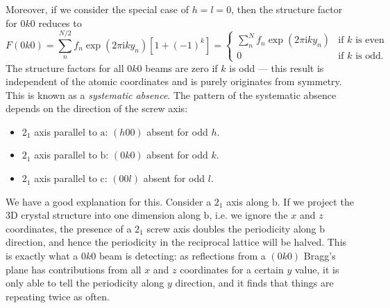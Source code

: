\documentclass{article}
\theoremstyle{plain}\theoremheaderfont{\normalfont\itshape}\theorembodyfont{\rmfamily}\theoremseparator{.}\newtheorem*{rem}{Remark}\newtheorem*{ex}{Example}\newtheorem*{proof}{Proof}\newtheorem*{altp}{Alternative proof}
\theoremstyle{plain}\theoremheaderfont{\normalfont\bfseries}\theorembodyfont{\rmfamily}\theoremseparator{.}\newtheorem{thm}{Theorem}[section]\newtheorem{lem}[thm]{Lemma}\newtheorem{prop}[thm]{Proposition}\newtheorem*{cor}{Corollary}\newtheorem{defn}[thm]{Definition}\newtheorem{clm}[thm]{Claim}\newtheorem{clminproof}{Claim}\newtheorem*{law}{Law}\newtheorem{pos}[thm]{Postulate}
\theoremstyle{break}\theoremheaderfont{\normalfont\itshape}\theorembodyfont{\rmfamily}\theoremseparator{.\medskip}\newtheorem*{proofskip}{Proof}\newtheorem*{exs}{Examples}\newtheorem*{rems}{Remarks}
\theoremstyle{break}\theoremheaderfont{\normalfont\bfseries}\theorembodyfont{\rmfamily}\theoremseparator{.\medskip}\newtheorem{lemskip}[thm]{Lemma}\newtheorem{defnskip}[thm]{Definition}\newtheorem{propskip}[thm]{Proposition}\newtheorem{thmskip}[thm]{Theorem}
\numberwithin{equation}{section}
\newcommand{\ii}{\mathrm{i}}
\newcommand{\vb}[1]{\bm{\mathrm{#1}}}
\begin{document}
    Moreover, if we consider the special case of \(h=l=0\), then the structure factor for \(0k0\) reduces to
    \begin{equation}
        F(0k0)=\sum_{n}^{N/2}f_n\exp(2\pi \ii ky_n)[1+(-1)^k]=\begin{cases}
            \sum_{n}^{N}f_n\exp(2\pi \ii ky_n) & \text{if \(k\) is even} \\
            0 & \text{if \(k\) is odd.}
        \end{cases}
    \end{equation}
    The structure factors for all \(0k0\) beams are zero if \(k\) is odd --- this result is independent of the atomic coordinates and is purely originates from symmetry. This is known as a \textit{systematic absence}. The pattern of the systematic absence depends on the direction of the screw axis:
    \begin{itemize}[topsep=0pt]
        \item \(2_1\) axis parallel to \(\vb{a}\): \((h00)\) absent for odd \(h\).
        \item \(2_1\) axis parallel to \(\vb{b}\): \((0k0)\) absent for odd \(k\).
        \item \(2_1\) axis parallel to \(\vb{c}\): \((00l)\) absent for odd \(l\).
    \end{itemize}

    We have a good explanation for this. Consider a \(2_1\) axis along \(\vb{b}\). If we project the 3D crystal structure into one dimension along \(\vb{b}\), i.e. we ignore the \(x\) and \(z\) coordinates, the presence of a \(2_1\) screw axis doubles the periodicity along \(\vb{b}\) direction, and hence the periodicity in the reciprocal lattice will be halved. This is exactly what a \(0k0\) beam is detecting: as reflections from a \((0k0)\) Bragg's plane has contributions from all \(x\) and \(z\) coordinates for a certain \(y\) value, it is only able to tell the periodicity along \(y\) direction, and it finds that things are repeating twice as often.
\end{document}
